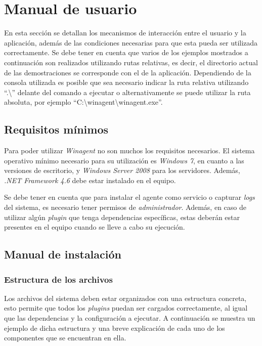 \section{Manual de usuario} \label{sec:man}
    En esta sección se detallan los mecanismos de interacción entre el usuario y la aplicación, además de las condiciones necesarias para que esta pueda ser utilizada correctamente. Se debe tener en cuenta que varios de los ejemplos mostrados a continuación son realizados utilizando rutas relativas, es decir, el directorio actual de las demostraciones se corresponde con el de la aplicación. Dependiendo de la consola utilizada es posible que sea necesario indicar la ruta relativa utilizando ``.\textbackslash'' delante del comando a ejecutar o alternativamente se puede utilizar la ruta absoluta, por ejemplo ``C:\textbackslash{}winagent\textbackslash{}winagent.exe''. 

    \subsection{Requisitos mínimos}
        Para poder utilizar \textit{Winagent} no son muchos los requisitos necesarios. El sistema operativo mínimo necesario para su utilización es \textit{Windows 7}, en cuanto a las versiones de escritorio, y \textit{Windows Server 2008} para los servidores. Además, \textit{.NET Framework 4.6} debe estar instalado en el equipo.
        
        Se debe tener en cuenta que para instalar el agente como servicio o capturar \textit{logs} del sistema, es necesario tener permisos de \textit{administrador}. Además, en caso de utilizar algún \textit{plugin} que tenga dependencias específicas, estas deberán estar presentes en el equipo cuando se lleve a cabo su ejecución.
        
    \subsection{Manual de instalación}
        \subsubsection{Estructura de los archivos}
            Los archivos del sistema deben estar organizados con una estructura concreta, esto permite que todos los \textit{plugins} puedan ser cargados correctamente, al igual que las dependencias y la configuración a ejecutar. A continuación se muestra un ejemplo de dicha estructura y una breve explicación de cada uno de los componentes que se encuentran en ella.\\
            
